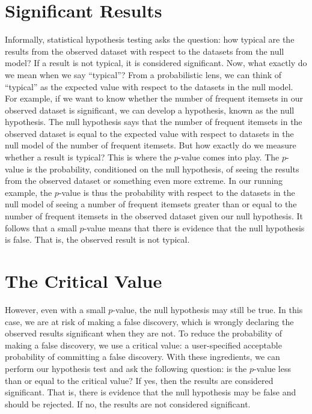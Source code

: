 \documentclass{article}
\begin{document}
\section*{Significant Results}

Informally, statistical hypothesis testing asks the question: how typical are
the results from the observed dataset with respect to the datasets from the null
model? If a result is not typical, it is considered significant. Now, what
exactly do we mean when we say ``typical''? From a probabilistic lens, we can
think of ``typical'' as the expected value with respect to the datasets in the
null model. For example, if we want to know whether the number of frequent
itemsets in our observed dataset is significant, we can develop a hypothesis,
known as the null hypothesis. The null hypothesis says that the number of
frequent itemsets in the observed dataset is equal to the expected value with
respect to datasets in the null model of the number of frequent itemsets. But
how exactly do we measure whether a result is typical? This is where the
$p$-value comes into play. The $p$-value is the probability, conditioned on the
null hypothesis, of seeing the results from the observed dataset or something
even more extreme. In our running example, the $p$-value is thus the probability
with respect to the datasets in the null model of seeing a number of frequent
itemsets greater than or equal to the number of frequent itemsets in the
observed dataset given our null hypothesis. It follows that a small $p$-value
means that there is evidence that the null hypothesis is false. That is, the
observed result is not typical.

\section*{The Critical Value}

However, even with a small $p$-value, the null hypothesis may still be true.
In this case, we are at risk of making a false discovery, which is wrongly
declaring the observed results significant when they are not. To reduce the
probability of making a false discovery, we use a critical value: a
user-specified acceptable probability of committing a false discovery. With
these ingredients, we can perform our hypothesis test and ask the following
question: is the $p$-value less than or equal to the critical value? If yes,
then the results are considered significant. That is, there is evidence that the
null hypothesis may be false and should be rejected. If no, the results are not
considered significant.
\end{document}
